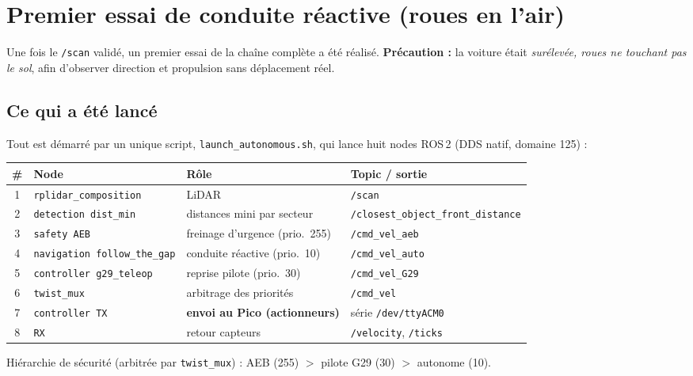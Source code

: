 \documentclass[a4paper,11pt]{article}
\begin{document}
\section{Premier essai de conduite réactive (roues en l'air)}\label{sec:essai}
Une fois le \texttt{/scan} validé, un premier essai de la chaîne complète a été
réalisé. \textbf{Précaution :} la voiture était \emph{surélevée, roues ne touchant
pas le sol}, afin d'observer direction et propulsion sans déplacement réel.

\subsection{Ce qui a été lancé}
Tout est démarré par un unique script, \texttt{launch\_autonomous.sh}, qui lance
huit nodes ROS\,2 (DDS natif, domaine 125) :
\begin{table}[H]
\centering
\begin{tabularx}{\textwidth}{@{}c l X l@{}}
\toprule
\# & Node & Rôle & Topic / sortie \\
\midrule
1 & \texttt{rplidar\_composition}        & LiDAR                              & \texttt{/scan} \\
2 & \texttt{detection dist\_min}          & distances mini par secteur        & \texttt{/closest\_object\_front\_distance} \\
3 & \texttt{safety AEB}                   & freinage d'urgence (prio.\ 255)   & \texttt{/cmd\_vel\_aeb} \\
4 & \texttt{navigation follow\_the\_gap}  & conduite réactive (prio.\ 10)     & \texttt{/cmd\_vel\_auto} \\
5 & \texttt{controller g29\_teleop}       & reprise pilote (prio.\ 30)        & \texttt{/cmd\_vel\_G29} \\
6 & \texttt{twist\_mux}                   & arbitrage des priorités           & \texttt{/cmd\_vel} \\
7 & \texttt{controller TX}                & \textbf{envoi au Pico (actionneurs)} & série \texttt{/dev/ttyACM0} \\
8 & \texttt{RX}                           & retour capteurs                   & \texttt{/velocity}, \texttt{/ticks} \\
\bottomrule
\end{tabularx}
\end{table}
\noindent Hiérarchie de sécurité (arbitrée par \texttt{twist\_mux}) :
AEB (255) $>$ pilote G29 (30) $>$ autonome (10).
\end{document}
